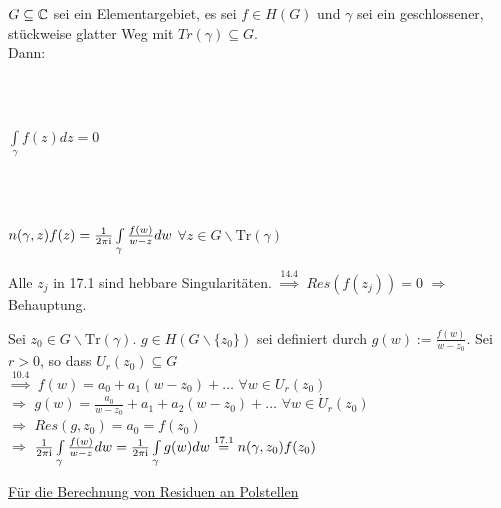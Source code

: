 \documentclass[a4paper,twoside,DIV15,BCOR12mm]{scrbook}
\def\wegint{\ensuremath{\int\limits_\gamma}}
\def\ie{\rm i}
\begin{document}
\begin{folgerung} 
  $G \subseteq \mathbb{C}$ sei ein Elementargebiet, es sei $f \in H(G)$ und $\gamma$ sei
  ein geschlossener, st\"uckweise glatter Weg mit $Tr(\gamma) \subseteq G$.\\
  Dann: 
  \begin{liste}
    \item {} \\ \\
    \centerline{$\wegint f(z) dz = 0$}
    \item {} \\ \\
    \centerline{$n(\gamma, z) f(z) = \frac{1}{2 \pi \ie} \wegint \frac{f(w)}{w-z}
    dw$ $\forall z \in G \backslash \text{Tr}(\gamma)$}
  \end{liste}
\end{folgerung}

\begin{beweis}
  \begin{liste}
    \item Alle $z_j$ in 17.1 sind hebbare Singularit\"aten.
    $\stackrel{\text{14.4}}{\Rightarrow}$ $Res(f(z_j)) = 0$ $\Rightarrow$
    Behauptung. 
    \item Sei $z_0 \in G \backslash \text{Tr}(\gamma)$. $g \in H(G \backslash
    \{z_0\})$ sei definiert durch $g(w) := \frac{f(w)}{w-z_0}$. Sei $r > 0$, so dass
    $U_r(z_0) \subseteq G$\\ $\stackrel{10.4}{\Rightarrow}$ $f(w) = a_0+a_1(w-z_0) +
    \ldots$ $\forall w \in U_r(z_0)$ \\ $\Rightarrow $ $g(w) = \frac{a_0}{w-z_0} +
    a_1 + a_2(w-z_0) + \ldots $ $\forall w \in \dot{U}_r(z_0)$ \\
    $\Rightarrow $ $Res(g, z_0) = a_0 = f(z_0)$ \\ 
    $\Rightarrow$ $\frac{1}{2 \pi \ie} \wegint \frac{f(w)}{w-z} dw = \frac{1}{2 \pi \ie
    } \wegint g(w) dw \stackrel{\text{17.1}}{=} n(\gamma, z_0) f(z_0)$
  \end{liste}
\end{beweis}

\underline{F\"ur die Berechnung von Residuen an Polstellen}
\end{document}
